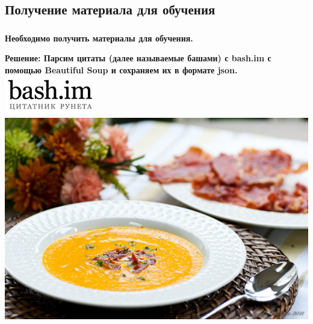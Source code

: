 \documentclass[t]{beamer}
\begin{document}
	\subsection{Получение материала для обучения}
	\begin{frame}
		\frametitle{\insertsection}
		\framesubtitle{\insertsubsection}
		\textbf{Необходимо получить материалы для обучения.}\pause
		
		\textbf{Решение: \newline Парсим цитаты (далее называемые башами) с bash.im с помощью Beautiful Soup и сохраняем их в формате json.}
		\includegraphics[scale = 0.8]{images/bash_im.png}
		\includegraphics[scale = 0.3]{images/beautiful_soup.jpg}
	\end{frame}
	
	
\end{document}
